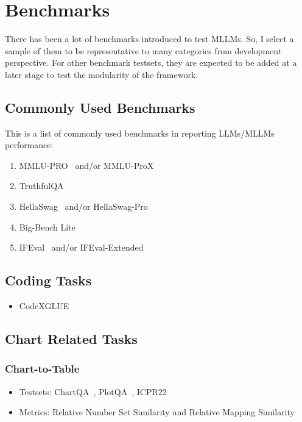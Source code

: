 \documentclass[
	letterpaper, %
]{jdf}
\begin{document}
\section{Benchmarks}\label{sect:benchmarks}
There has been a lot of benchmarks introduced to test MLLMs.
So, I select a sample of them to be representative to many categories from development perspective.
For other benchmark testsets, they are expected to be added at a later stage to test the modularity of the framework.
\subsection{Commonly Used Benchmarks}\label{ssect:common}
This is a list of commonly used benchmarks in reporting LLMs/MLLMs performance:
\begin{enumerate}
    \item MMLU-PRO~\cite{wang2024mmlu} and/or MMLU-ProX~\cite{xuan2025mmlu}
    \item TruthfulQA\cite{lin2021truthfulqa}
    \item HellaSwag~\cite{zellers2019hellaswag} and/or HellaSwag-Pro~\cite{li2025hellaswag}
    \item Big-Bench Lite~\cite{srivastava2023beyond}
    \item IFEval~\cite{zhou2023instruction} and/or IFEval-Extended~\cite{kovalevskyi2024ifeval}
              \end{enumerate}
              \subsection{Coding Tasks}
              \begin{itemize}
    \item CodeXGLUE~\cite{lu2021codexglue}
                            \end{itemize}
                            \subsection{Chart Related Tasks}
\subsubsection{Chart-to-Table}
\begin{itemize}
    \item Testsets: ChartQA~\cite{masry2022chartqa}, PlotQA~\cite{methani2020plotqa}, ICPR22
         \item Metrics: Relative Number Set Similarity and Relative Mapping Similarity~\cite{liu2022deplot}
              \end{itemize}
\end{document}
